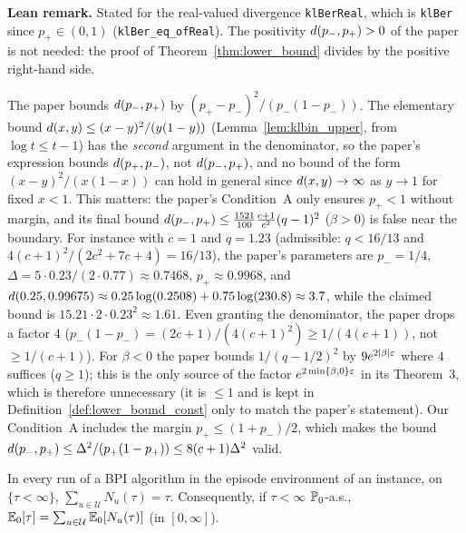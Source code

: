 \textbf{Lean remark.} Stated for the real-valued divergence \texttt{klBerReal}, which is
\texttt{klBer} since $p_+ \in (0, 1)$ (\texttt{klBer\_eq\_ofReal}). The positivity
$d(p_-, p_+) > 0$ of the paper is not needed: the proof of Theorem~\ref{thm:lower_bound} divides
by the positive right-hand side.

\begin{remark}\label{rem:lb_kl_paper}
The paper bounds $d(p_-,p_+)$ by $(p_+ - p_-)^2/(p_-(1-p_-))$. The elementary bound
$d(x,y) \le (x-y)^2/(y(1-y))$ (Lemma~\ref{lem:klbin_upper}, from $\log t \le t - 1$) has the
\emph{second} argument in the denominator, so the paper's expression bounds $d(p_+, p_-)$,
not $d(p_-, p_+)$, and no bound of the form $(x - y)^2/(x(1-x))$ can hold in general since
$d(x, y) \to \infty$ as $y \to 1$ for fixed $x < 1$. This matters: the paper's Condition~A
only ensures $p_+ < 1$ without margin, and its final bound
$d(p_-,p_+) \le \frac{1521}{100}\frac{c+1}{c^2}(q-1)^2$ ($\beta > 0$) is false near the
boundary. For instance with $c = 1$ and $q = 1.23$ (admissible: $q < 16/13$ and
$4(c+1)^2/(2c^2+7c+4) = 16/13$), the paper's parameters are $p_- = 1/4$,
$\Delta = 5\cdot 0.23/(2\cdot 0.77) \approx 0.7468$, $p_+ \approx 0.9968$, and
$d(0.25, 0.99675) \approx 0.25\log(0.2508) + 0.75\log(230.8) \approx 3.7$, while the claimed
bound is $15.21\cdot 2\cdot 0.23^2 \approx 1.61$. Even granting the denominator, the paper drops
a factor $4$ ($p_-(1-p_-) = (2c+1)/(4(c+1)^2) \ge 1/(4(c+1))$, not $\ge 1/(c+1)$). For $\beta < 0$
the paper bounds $1/(q - 1/2)^2$ by $9e^{2|\beta|\varepsilon}$ where $4$ suffices ($q \ge 1$); this
is the only source of the factor $e^{2\min\{\beta,0\}\varepsilon}$ in its Theorem~3, which is therefore
unnecessary (it is $\le 1$ and is kept in Definition~\ref{def:lower_bound_const} only to match
the paper's statement). Our Condition~A includes the margin $p_+ \le (1+p_-)/2$, which makes
the bound $d(p_-,p_+) \le \Delta^2/(p_+(1-p_+)) \le 8(c+1)\Delta^2$ valid.
\end{remark}

\begin{lemma}\label{lem:hard_count_sum}
\leanok
In every run of a BPI algorithm in the episode environment of an instance, on $\{\tau < \infty\}$,
$\sum_{u \in \mathcal U} N_u(\tau) = \tau$. Consequently, if $\tau < \infty$ $\mathbb{P}_0$-a.s.,
$\mathbb{E}_0[\tau] = \sum_{u \in \mathcal U}\mathbb{E}_0[N_u(\tau)]$ (in $[0,\infty]$).
\end{lemma}

